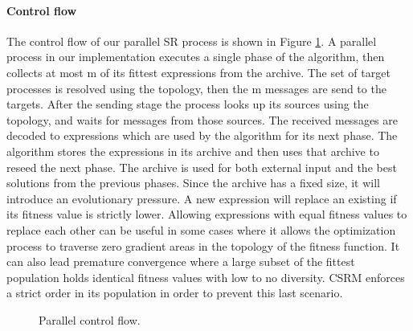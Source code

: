 \paragraph{Control flow}
The control flow of our parallel SR process is shown in Figure \ref{fig:parallelflow}.
A parallel process in our implementation executes a single phase of the algorithm, then collects at most m of its fittest expressions from the archive. 
The set of target processes is resolved using the topology, then the m messages are send to the targets. 
After the sending stage the process looks up its sources using the topology, and waits for messages from those sources. 
The received messages are decoded to expressions which are used by the algorithm for its next phase. The algorithm stores the expressions in its archive and then uses that archive to reseed the next phase. The archive is used for both external input and the best solutions from the previous phases. Since the archive has a fixed size, it will introduce an evolutionary pressure. A new expression will replace an existing if its fitness value is strictly lower. Allowing expressions with equal fitness values to replace each other can be useful in some cases where it allows the optimization process to traverse zero gradient areas in the topology of the fitness function. It can also lead premature convergence where a large subset of the fittest population holds identical fitness values with low to no diversity. CSRM enforces a strict order in its population in order to prevent this last scenario. 

\begin{figure}
\caption{Parallel control flow.}
\label{fig:parallelflow}
\end{figure}

